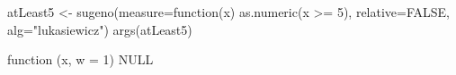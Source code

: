 \begin{Schunk}
% --begin: "quant1"
\begin{Sinput}
 atLeast5 <- sugeno(measure=function(x) as.numeric(x >= 5),
                    relative=FALSE,
                    alg="lukasiewicz")
 args(atLeast5)
\end{Sinput}
\begin{Soutput}
function (x, w = 1) 
NULL
\end{Soutput}
%
% --end: "quant1"
\end{Schunk}
